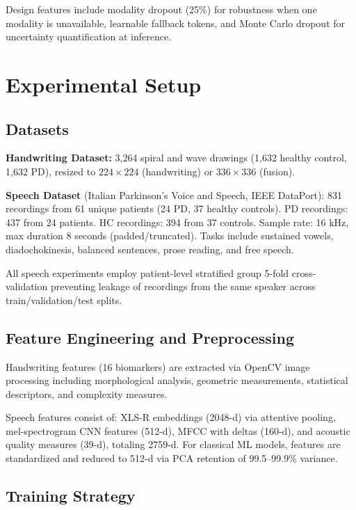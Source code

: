 \documentclass[10pt,conference,letterpaper]{IEEEtran}
\begin{document}
Design features include modality dropout (25\%) for robustness when one modality is unavailable, learnable fallback tokens, and Monte Carlo dropout for uncertainty quantification at inference.

\section{Experimental Setup}

\subsection{Datasets}

\textbf{Handwriting Dataset:} 3,264 spiral and wave drawings (1,632 healthy control, 1,632 PD), resized to $224 \times 224$ (handwriting) or $336 \times 336$ (fusion).

\textbf{Speech Dataset} (Italian Parkinson's Voice and Speech, IEEE DataPort): 831 recordings from 61 unique patients (24 PD, 37 healthy controls). PD recordings: 437 from 24 patients. HC recordings: 394 from 37 controls. Sample rate: 16 kHz, max duration 8 seconds (padded/truncated). Tasks include sustained vowels, diadochokinesis, balanced sentences, prose reading, and free speech.

All speech experiments employ patient-level stratified group 5-fold cross-validation preventing leakage of recordings from the same speaker across train/validation/test splits.

\subsection{Feature Engineering and Preprocessing}

Handwriting features (16 biomarkers) are extracted via OpenCV image processing including morphological analysis, geometric measurements, statistical descriptors, and complexity measures.

Speech features consist of: XLS-R embeddings (2048-d) via attentive pooling, mel-spectrogram CNN features (512-d), MFCC with deltas (160-d), and acoustic quality measures (39-d), totaling 2759-d. For classical ML models, features are standardized and reduced to 512-d via PCA retention of 99.5--99.9\% variance.

\subsection{Training Strategy}
\end{document}
